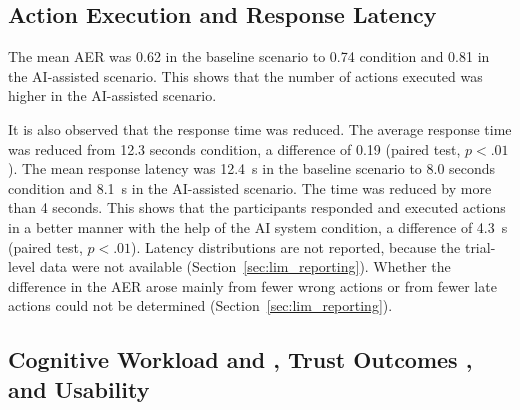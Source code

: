 \documentclass[journal]{IEEEtran}
\theoremstyle{plain}
\theoremstyle{definition}
\providecommand{\DIFaddtex}[1]{{\protect\color{blue} \sf #1}} %
\providecommand{\DIFdeltex}[1]{{\protect\color{red} \scriptsize #1}} %
\providecommand{\DIFaddbegin}{} %
\providecommand{\DIFaddend}{} %
\providecommand{\DIFdelbegin}{} %
\providecommand{\DIFdelend}{} %
\providecommand{\DIFadd}[1]{\texorpdfstring{\DIFaddtex{#1}}{#1}} %
\providecommand{\DIFdel}[1]{\texorpdfstring{\DIFdeltex{#1}}{}} %
\newcommand{\DIFscaledelfig}{0.5}
\newlength{\DIFdelgraphicswidth} %
\newlength{\DIFdelgraphicsheight} %
\newcommand{\DIFaddincludegraphics}[2][]{{\color{blue}\fbox{\DIFOincludegraphics[#1]{#2}}}} %
\newcommand{\DIFdelincludegraphics}[2][]{%
\sbox{\DIFdelgraphicsbox}{\DIFOincludegraphics[#1]{#2}}%
\settoboxwidth{\DIFdelgraphicswidth}{\DIFdelgraphicsbox} %
\settoboxtotalheight{\DIFdelgraphicsheight}{\DIFdelgraphicsbox} %
\scalebox{\DIFscaledelfig}{%
\parbox[b]{\DIFdelgraphicswidth}{\usebox{\DIFdelgraphicsbox}\\[-\baselineskip] \rule{\DIFdelgraphicswidth}{0em}}\llap{\resizebox{\DIFdelgraphicswidth}{\DIFdelgraphicsheight}{%
\setlength{\unitlength}{\DIFdelgraphicswidth}%
\begin{picture}(1,1)%
\thicklines\linethickness{2pt} %
{\color[rgb]{1,0,0}\put(0,0){\framebox(1,1){}}}%
{\color[rgb]{1,0,0}\put(0,0){\line( 1,1){1}}}%
{\color[rgb]{1,0,0}\put(0,1){\line(1,-1){1}}}%
\end{picture}%
}\hspace*{3pt}}} %
} %
\DeclareRobustCommand{\DIFaddbegin}{\DIFOaddbegin \let\includegraphics\DIFaddincludegraphics} %
\DeclareRobustCommand{\DIFaddend}{\DIFOaddend \let\includegraphics\DIFOincludegraphics} %
\DeclareRobustCommand{\DIFdelbegin}{\DIFOdelbegin \let\includegraphics\DIFdelincludegraphics} %
\DeclareRobustCommand{\DIFdelend}{\DIFOaddend \let\includegraphics\DIFOincludegraphics} %
\begin{document}
    \subsection{\DIFadd{Action Execution and Response Latency}}
    \DIFadd{The mean AER was 0.62 }\DIFaddend in the baseline \DIFdelbegin \DIFdel{scenario to 0.74 }\DIFdelend \DIFaddbegin \DIFadd{condition and 0.81 }\DIFaddend in the AI-assisted \DIFdelbegin \DIFdel{scenario. This shows that the number of actions executed was higher in the AI-assisted scenario.
}%

\DIFdel{It is also observed that the response time was reduced.
    The average response time was reduced from 12.3 seconds }\DIFdelend \DIFaddbegin \DIFadd{condition, a difference of 0.19 (paired test, $p < .01$).
    The mean response latency was 12.4~s }\DIFaddend in the baseline \DIFdelbegin \DIFdel{scenario to 8.0 seconds }\DIFdelend \DIFaddbegin \DIFadd{condition and 8.1~s }\DIFaddend in the AI-assisted \DIFdelbegin \DIFdel{scenario. The time was reduced by more than 4 seconds.
    This shows that the participants responded and executed actions in a better manner with the help of the AI system}\DIFdelend \DIFaddbegin \DIFadd{condition, a difference of 4.3~s (paired test, $p < .01$). Latency distributions are not reported, because the trial-level data were not available (Section~\ref{sec:lim_reporting}).
    Whether the difference in the AER arose mainly from fewer wrong actions or from fewer late actions could not be determined (Section~\ref{sec:lim_reporting})}\DIFaddend .

    \subsection{\DIFdelbegin \DIFdel{Cognitive }\DIFdelend Workload\DIFdelbegin \DIFdel{and }\DIFdelend \DIFaddbegin \DIFadd{, }\DIFaddend Trust\DIFdelbegin \DIFdel{Outcomes}\DIFdelend \DIFaddbegin \DIFadd{, and Usability}\DIFaddend }
    \DIFdelbegin %
\end{document}
